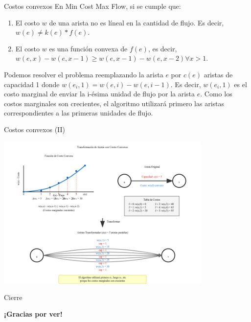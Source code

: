 \documentclass{beamer}
\begin{document}
\begin{frame}{Costos convexos}
    En Min Cost Max Flow, si se cumple que:
    \begin{enumerate}
        \item El costo $w$ de una arista no es líneal en la cantidad de flujo. Es decir, $w(e) \neq k(e) * f(e)$.
        \item El costo $w$ es una función convexa de $f(e)$, es decir, $w(e,x) - w(e,x-1) \geq w(e,x-1) - w(e,x-2) \forall x > 1$.
    \end{enumerate}

    Podemos resolver el problema reemplazando la arista $e$ por $c(e)$ aristas de capacidad 1 donde $w(e_i,1) = w(e,i) - w(e,i-1)$.
    Es decir, $w(e_i,1)$ es el costo marginal de enviar la i-ésima unidad de flujo por la arista $e$. Como los costos marginales son crecientes, el algoritmo utilizará primero las aristas correspondientes a las primeras unidades de flujo.
\end{frame}

\begin{frame}{Costos convexos (II)}
    \begin{center}
    \includegraphics[width=0.8\textwidth]{imgs/convex-cost-flow.png}
    \end{center}
\end{frame}


\begin{frame}{Cierre}
    \begin{center}
        \vspace{2cm}
        {\Huge \textbf{¡Gracias por ver!}}
        \vspace{2cm}
    \end{center}
\end{frame}
\end{document}
